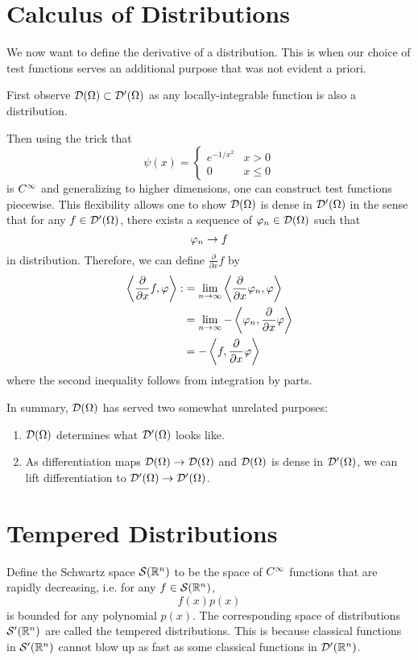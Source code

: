 \section{Calculus of Distributions}
We now want to define the derivative of a distribution. This is when our choice of test functions serves an additional purpose that was not evident a priori.

First observe ${\mathcal D}(\Omega) \subset {\mathcal D}'(\Omega)$ as any locally-integrable function is also a distribution.

Then using the trick that
\[
    \psi(x) =
    \begin{cases}
        e^{-1/x^2}                                                      & x > 0 \\
        0                                                               & x \le 0
    \end{cases}
\]
is $C^\infty$ and generalizing to higher dimensions, one can construct test functions piecewise. This flexibility allows one to show ${\mathcal D}(\Omega)$ is dense in ${\mathcal D}'(\Omega)$ in the sense that for any $f \in {\mathcal D}'(\Omega)$, there exists a sequence of $\varphi_n \in {\mathcal D}(\Omega)$ such that
\[
    \varphi_n \to f
\]
in distribution. Therefore, we can define $\frac{\partial}{\partial x}f$ by
\[
    \begin{split}
        \left\langle \frac{\partial}{\partial x}f, \varphi \right\rangle : & = \lim_{n \to \infty} \left\langle \frac{\partial}{\partial x}\varphi_n, \varphi \right\rangle \\
                                                                        & = \lim_{n \to \infty} -\left\langle \varphi_n, \frac{\partial}{\partial x}\varphi \right\rangle\\
                                                                        & = -\left\langle f, \frac{\partial}{\partial x}\varphi \right\rangle
    \end{split}
\]
where the second inequality follows from integration by parts.

In summary, ${\mathcal D}(\Omega)$ has served two somewhat unrelated purposes:
\begin{enumerate}
    \item ${\mathcal D}(\Omega)$ determines what ${\mathcal D}'(\Omega)$ looks like.
    \item As differentiation maps ${\mathcal D}(\Omega) \to {\mathcal D}(\Omega)$ and ${\mathcal D}(\Omega)$ is dense in ${\mathcal D}'(\Omega)$, we can lift differentiation to ${\mathcal D}'(\Omega) \to {\mathcal D}'(\Omega)$.
\end{enumerate}

\section{Tempered Distributions}
Define the Schwartz space ${\mathcal S}({\mathbb R}^n)$ to be the space of $C^\infty$ functions that are rapidly decreasing, i.e. for any $f \in {\mathcal S}({\mathbb R}^n)$,
\[
    f(x)p(x)
\]
is bounded for any polynomial $p(x)$. The corresponding space of distributions ${\mathcal S}'({\mathbb R}^n)$ are called the tempered distributions. This is because classical functions in ${\mathcal S}'({\mathbb R}^n)$ cannot blow up as fast as some classical functions in ${\mathcal D}'({\mathbb R}^n)$.

